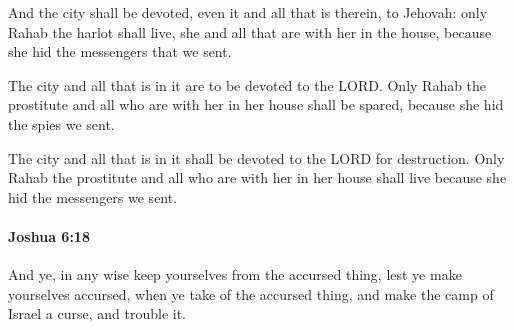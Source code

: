 			\begin{versebox}
					\item[BHS] 
					\item[ASV] And the city shall be devoted, even it and all that is therein, to Jehovah: only Rahab the harlot shall live, she and all that are with her in the house, because she hid the messengers that we sent.
					\item[NIV] The city and all that is in it are to be devoted to the LORD. Only Rahab the prostitute and all who are with her in her house shall be spared, because she hid the spies we sent.
					\item[NRSV] The city and all that is in it shall be devoted to the LORD for destruction. Only Rahab the prostitute and all who are with her in her house shall live because she hid the messengers we sent.
			\end{versebox}

		\paragraph{Joshua 6:18} %
			\label{JOSHUA-6-18}

			And ye, in any wise keep yourselves from the accursed thing, lest ye make yourselves accursed, when ye take of the accursed thing, and make the camp of Israel a curse, and trouble it.

